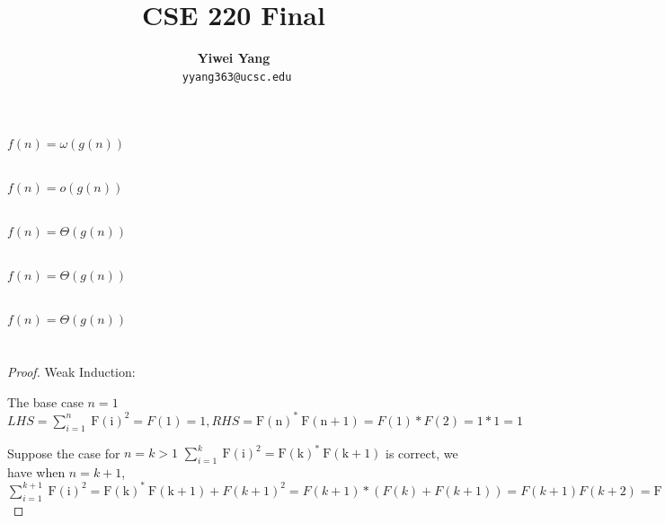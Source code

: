 \documentclass[a4paper]{article}
\title{CSE 220 Final}
\author{\textbf{Yiwei Yang} \\ \texttt{ yyang363@ucsc.edu}}
\begin{document}
\maketitle
\section{}

\subsection{}
$f(n)=\omega(g(n))$
\subsection{}
$f(n)=o(g(n))$
\subsection{}
$f(n)=\Theta(g(n))$
\subsection{}
$f(n)=\Theta(g(n))$
\subsection{}
$f(n)=\Theta(g(n))$
\section{}
\subsection{}

\begin{proof}
  Weak Induction:

  The base case $n=1$ $LHS=\sum_{i=1}^n \mathrm{~F}(\mathrm{i})^2=F(1)=1, RHS= \mathrm{F}(\mathrm{n})^* \mathrm{~F}(\mathrm{n}+1)=F(1)*F(2)=1*1=1$
  
  Suppose the case for $n=k> 1$ $\sum_{i=1}^k \mathrm{~F}(\mathrm{i})^2=\mathrm{F}(\mathrm{k})^* \mathrm{~F}(\mathrm{k}+1)$ is correct, we have when $n=k+1$, $\sum_{i=1}^{k+1} \mathrm{~F}(\mathrm{i})^2=\mathrm{F}(\mathrm{k})^* \mathrm{~F}(\mathrm{k}+1)+F(k+1)^2=F(k+1)*(F(k)+F(k+1))=F(k+1)F(k+2)= \mathrm{F}(\mathrm{k+1})^* \mathrm{~F}(\mathrm{k}+2)$
\end{proof}
\end{document}
